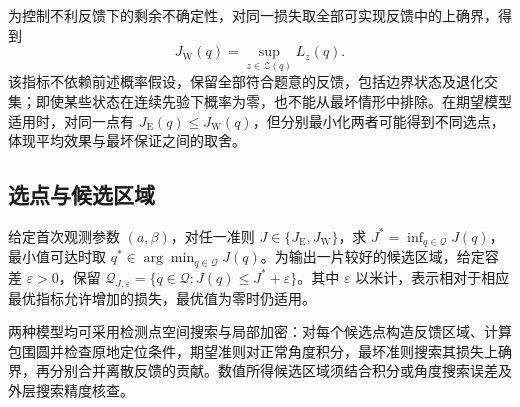 为控制不利反馈下的剩余不确定性，对同一损失取全部可实现反馈中的上确界，得到
\begin{equation}
 J_{\mathrm W}(q)=\sup_{z\in\mathcal Z(q)}L_z(q).
\label{eq:q2-pair-worst-objective}
\end{equation}
该指标不依赖前述概率假设，保留全部符合题意的反馈，包括边界状态及退化交集；即使某些状态在连续先验下概率为零，也不能从最坏情形中排除。在期望模型适用时，对同一点有 \(J_{\mathrm E}(q)\le J_{\mathrm W}(q)\)，但分别最小化两者可能得到不同选点，体现平均效果与最坏保证之间的取舍。

\subsection{选点与候选区域}

给定首次观测参数 \((a,\beta)\)，对任一准则 \(J\in\{J_{\mathrm E},J_{\mathrm W}\}\)，求 \(J^*=\inf_{q\in\mathcal Q}J(q)\)，最小值可达时取 \(q^*\in\arg\min_{q\in\mathcal Q}J(q)\)。为输出一片较好的候选区域，给定容差 \(\varepsilon>0\)，保留 \(\mathcal Q_{J,\varepsilon}=\{q\in\mathcal Q:J(q)\le J^*+\varepsilon\}\)。其中 \(\varepsilon\) 以米计，表示相对于相应最优指标允许增加的损失，最优值为零时仍适用。

两种模型均可采用检测点空间搜索与局部加密：对每个候选点构造反馈区域、计算包围圆并检查原地定位条件，期望准则对正常角度积分，最坏准则搜索其损失上确界，再分别合并离散反馈的贡献。数值所得候选区域须结合积分或角度搜索误差及外层搜索精度核查。
